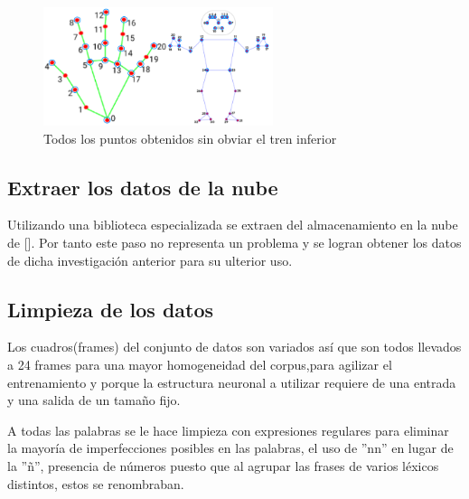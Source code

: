 \begin{figure}[ht!]
    \centering
    \includegraphics[width=0.6\textwidth]{Graphics/points.png}
    \caption{Todos los puntos obtenidos sin obviar el tren inferior}
    \label{fig:points}
\end{figure}
\subsection{Extraer los datos de la nube}
Utilizando una biblioteca especializada se extraen del almacenamiento en la nube de [\cite{leynier-lsc-2021}]. Por tanto este paso no representa un problema y se logran obtener los datos de dicha investigación anterior para su ulterior uso.
\subsection{Limpieza de los datos}
Los cuadros(frames) del conjunto de datos son variados así que son todos llevados a 24 frames para una mayor homogeneidad del corpus,para agilizar el entrenamiento y porque la estructura neuronal a utilizar requiere de una entrada y una salida de un tamaño fijo.

 A todas las palabras se le hace limpieza con expresiones regulares para eliminar la mayoría de imperfecciones posibles en las palabras, el uso de ''nn'' en lugar de la ''ñ'', presencia de números puesto que al agrupar las frases de varios léxicos distintos, estos se renombraban.
 



